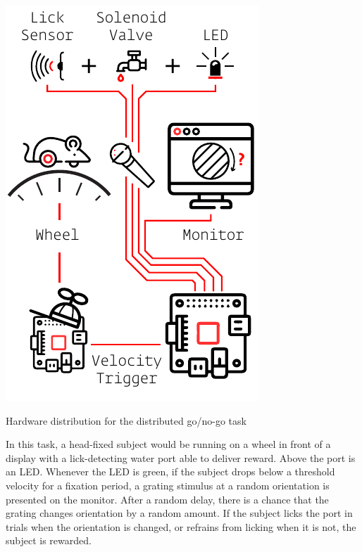 \begin{marginfigure}[1cm]
\includegraphics[]{figures/test_5_gonogo.pdf}
\caption{Hardware distribution for the distributed go/no-go task}
\label{fig:gonogo}
\end{marginfigure}

In this task, a head-fixed subject would be running on a wheel in front of a display with a lick-detecting water port able to deliver reward. Above the port is an LED. Whenever the LED is green, if the subject drops below a threshold velocity for a fixation period, a grating stimulus at a random orientation is presented on the monitor. After a random delay, there is a chance that the grating changes orientation by a random amount. If the subject licks the port in trials when the orientation is changed, or refrains from licking when it is not, the subject is rewarded. 

